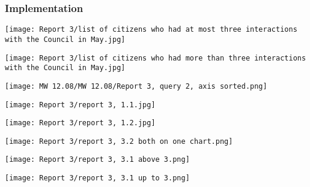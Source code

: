 			\subsubsection{Implementation}
			
			
\begin{center}
  \texttt{[image: Report 3/list of citizens who had at most three interactions with the Council in May.jpg]}
  \label{normal_case}
\end{center}
			

\begin{center}
  \texttt{[image: Report 3/list of citizens who had more than three interactions with the Council in May.jpg]}
  \label{normal_case}
\end{center}



\begin{center}
  \texttt{[image: MW 12.08/MW 12.08/Report 3, query 2, axis sorted.png]}
  \label{normal_case}
\end{center}


\begin{center}
  \texttt{[image: Report 3/report 3, 1.1.jpg]}
  \label{normal_case}
\end{center}



\begin{center}
  \texttt{[image: Report 3/report 3, 1.2.jpg]}
  \label{normal_case}
\end{center}


\begin{center}
  \texttt{[image: Report 3/report 3, 3.2 both on one chart.png]}
  \label{normal_case}
\end{center}


\begin{center}
  \texttt{[image: Report 3/report 3, 3.1 above 3.png]}
  \label{normal_case}
\end{center}


\begin{center}
  \texttt{[image: Report 3/report 3, 3.1 up to 3.png]}
  \label{normal_case}
\end{center}


